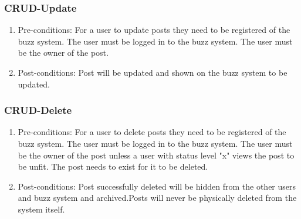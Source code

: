 \documentclass[12pt, oneside]{article}
\begin{document}
\subsubsection{CRUD-Update}
\begin{enumerate}
 \item Pre-conditions:  For a user to update posts they need to be registered of the buzz system. The user must be logged in to the buzz system. The user must be the owner of the post.
 \\
 \item Post-conditions: Post will be updated and shown on the buzz system to be updated.
   \\

\end{enumerate}

\subsubsection{CRUD-Delete}
\begin{enumerate}
 \item Pre-conditions:  For a user to delete posts they need to be registered of the buzz system. The user must be logged in to the buzz system. The user must be the owner of the post unless a user with status level "x" views the post to be unfit. The post needs to exist for it to be deleted.
 \\
 \item Post-conditions: Post successfully deleted will be hidden from the other users and buzz system and archived.Posts will never be physically deleted from the system itself.
   \\

\end{enumerate}
\end{document}
